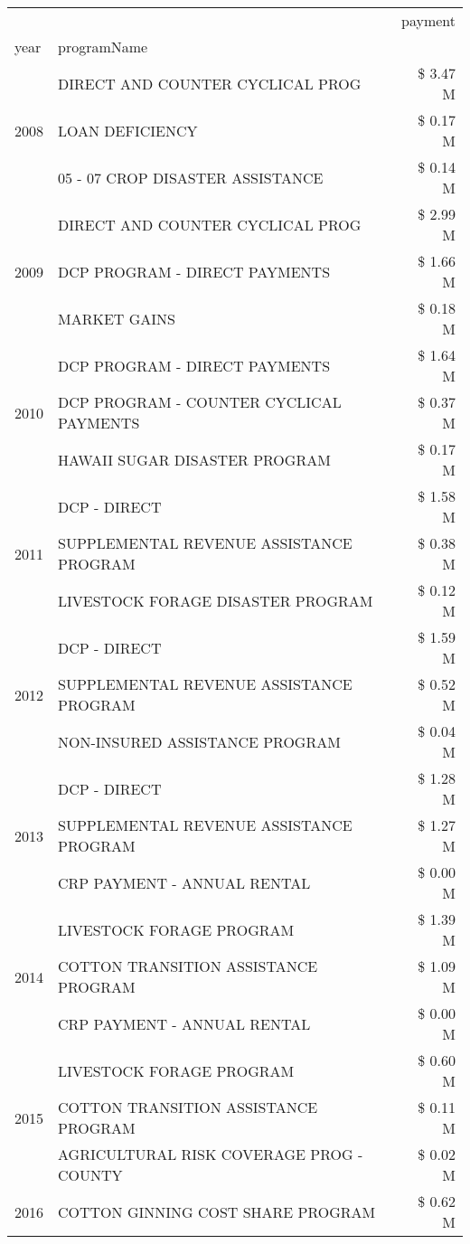 \begin{tabular}{llr}
\toprule
 &  & payment \\
year & programName &  \\
\midrule
\multirow[t]{3}{*}{2008} & DIRECT AND COUNTER CYCLICAL PROG & \$ 3.47 M \\
 & LOAN DEFICIENCY & \$ 0.17 M \\
 & 05 - 07 CROP DISASTER ASSISTANCE & \$ 0.14 M \\
\cline{1-3}
\multirow[t]{3}{*}{2009} & DIRECT AND COUNTER CYCLICAL PROG & \$ 2.99 M \\
 & DCP PROGRAM - DIRECT PAYMENTS & \$ 1.66 M \\
 & MARKET GAINS & \$ 0.18 M \\
\cline{1-3}
\multirow[t]{3}{*}{2010} & DCP PROGRAM - DIRECT PAYMENTS & \$ 1.64 M \\
 & DCP PROGRAM - COUNTER CYCLICAL PAYMENTS & \$ 0.37 M \\
 & HAWAII SUGAR DISASTER PROGRAM & \$ 0.17 M \\
\cline{1-3}
\multirow[t]{3}{*}{2011} & DCP - DIRECT & \$ 1.58 M \\
 & SUPPLEMENTAL REVENUE ASSISTANCE PROGRAM & \$ 0.38 M \\
 & LIVESTOCK FORAGE DISASTER PROGRAM & \$ 0.12 M \\
\cline{1-3}
\multirow[t]{3}{*}{2012} & DCP - DIRECT & \$ 1.59 M \\
 & SUPPLEMENTAL REVENUE ASSISTANCE PROGRAM & \$ 0.52 M \\
 & NON-INSURED ASSISTANCE PROGRAM & \$ 0.04 M \\
\cline{1-3}
\multirow[t]{3}{*}{2013} & DCP - DIRECT & \$ 1.28 M \\
 & SUPPLEMENTAL REVENUE ASSISTANCE PROGRAM & \$ 1.27 M \\
 & CRP PAYMENT - ANNUAL RENTAL & \$ 0.00 M \\
\cline{1-3}
\multirow[t]{3}{*}{2014} & LIVESTOCK FORAGE PROGRAM & \$ 1.39 M \\
 & COTTON TRANSITION ASSISTANCE PROGRAM & \$ 1.09 M \\
 & CRP PAYMENT - ANNUAL RENTAL & \$ 0.00 M \\
\cline{1-3}
\multirow[t]{3}{*}{2015} & LIVESTOCK FORAGE PROGRAM & \$ 0.60 M \\
 & COTTON TRANSITION ASSISTANCE PROGRAM & \$ 0.11 M \\
 & AGRICULTURAL RISK COVERAGE PROG - COUNTY & \$ 0.02 M \\
\cline{1-3}
\multirow[t]{3}{*}{2016} & COTTON GINNING COST SHARE PROGRAM & \$ 0.62 M \\

\end{tabular}
